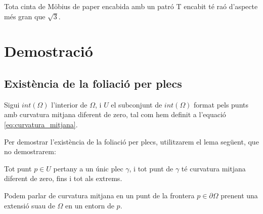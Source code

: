 \begin{lema}[\textbf{G}]\label{lema G}
    Tota cinta de Möbius de paper encabida amb un patró T encabit té raó d'aspecte més gran que $\sqrt{3}$.
\end{lema}

\section{Demostració}
\subsection{Existència de la foliació per plecs}
Sigui $int(\Omega)$ l'interior de $\Omega$, i $U$ el subconjunt de $int(\Omega)$ format pels punts amb curvatura mitjana diferent de zero, tal com hem definit a l'equació \eqref{eq:curvatura_mitjana}.

Per demostrar l'existència de la foliació per plecs, utilitzarem el lema següent, que no demostrarem:
\begin{lema}\label{lema:2.2}
    Tot punt $p\in U$ pertany a un únic plec $\gamma$, i tot punt de $\gamma$ té curvatura mitjana diferent de zero, fins i tot als extrems.
\end{lema}
Podem parlar de curvatura mitjana en un punt de la frontera $p\in\partial \Omega$ prenent una extensió suau de $\Omega$ en un entorn de $p$.

